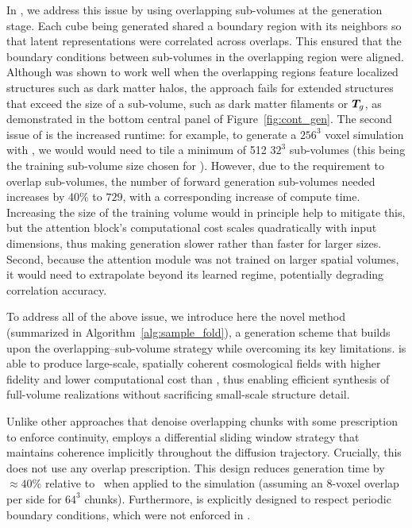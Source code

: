 In \LODI, we address this issue by using overlapping sub-volumes at the generation stage. Each cube being generated shared a boundary region with its neighbors so that latent representations were correlated across overlaps. This ensured that the boundary conditions between sub-volumes in the overlapping region were aligned.
Although \LODI was shown to work well when the overlapping regions feature localized structures such as dark matter halos, the approach fails for extended structures that exceed the size of a sub-volume, such as dark matter filaments or $\bm{T}_g$, as demonstrated in the bottom central panel of Figure~\ref{fig:cont_gen}. The second issue of \LODI is the increased runtime: for example, to generate a $256^3$ voxel simulation with \LODI, we would would need to tile a minimum of 512 $32^3$ sub-volumes (this being the training sub-volume size chosen for \LODI).  However, due to the requirement to overlap sub-volumes, the number of forward generation sub-volumes needed increases by 40\% to $729$, with a corresponding increase of compute time. Increasing the size of the training volume would in principle help to mitigate this, but the attention block's computational cost scales quadratically with input dimensions, thus making generation slower rather than faster for larger sizes. Second, because the attention module was not trained on larger spatial volumes, it would need to extrapolate beyond its learned regime, potentially degrading correlation accuracy.
\vspace{\baselineskip}

To address all of the above issue, we introduce here the novel \FOLD method (summarized in Algorithm~\ref{alg:sample_fold}), a generation scheme that builds upon the overlapping–sub-volume strategy while overcoming its key limitations. \FOLD is able to produce large-scale, spatially coherent cosmological fields with higher fidelity and lower computational cost than \LODI, thus enabling efficient synthesis of full-volume realizations without sacrificing small-scale structure detail.


Unlike other approaches that denoise overlapping chunks with some prescription to enforce continuity, \FOLD employs a differential sliding window strategy that maintains coherence implicitly throughout the diffusion trajectory. Crucially, this does not use any overlap prescription.
This design reduces generation time by $\approx40\%$ relative to \LODI\ when applied to the \TNG simulation (assuming an 8-voxel overlap per side for $64^3$ chunks).
Furthermore, \FOLD is explicitly designed to respect periodic boundary conditions, which were not enforced in \LODI.


